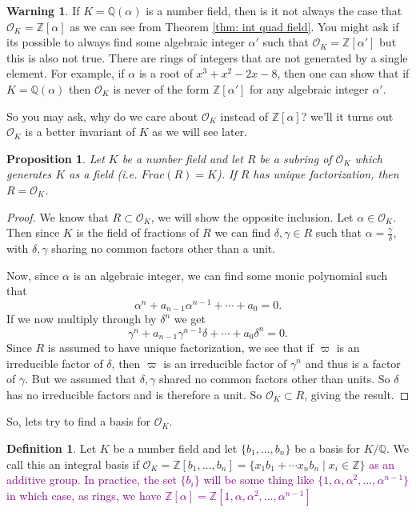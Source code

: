 \documentclass[11pt,a4paper]{report}
\theoremstyle{plain}
\newtheorem{prop}[subsection]{Proposition}
\theoremstyle{definition}
\newtheorem{defn}[subsection]{Definition}
\theoremstyle{definition}
\newtheorem{warn}[subsection]{Warning}
\newcommand{\ZZ}{\mathbb{Z}}
\def\QQ{\mathbb{Q}}
\def \a{\alpha}
\def \g {\gamma}
\def \OO {\mathcal{O}}
\begin{document}
	\begin{warn}
		If $K=\QQ(\a)$ is a number field, then is it not always the case that $\OO_K=\ZZ[\a]$ as we can see from Theorem \ref{thm: int quad field}. You might ask if its possible to always find some algebraic integer $\a'$ such that $\OO_K=\ZZ[\a']$ but this is also not true. There are rings of integers that are not generated by a single element. For example, if $\a$ is a root of $x^3+x^2-2x-8$, then one can show that if $K=\QQ(\a)$ then $\OO_K$ is never of the form $\ZZ[\a']$ for any algebraic integer $\a'$.
	\end{warn}
	
	
	So you may ask, why do we care about $\OO_K$ instead of $\ZZ[\a]$? we'll it turns out $\OO_K$ is a better invariant of $K$ as we will see later. 
	
	\begin{prop}
		Let $K$ be a number field and let $R$ be a subring of $\OO_K$ which generates $K$ as a field (i.e. $Frac(R)=K$).  If $R$ has unique factorization, then $R=\OO_K$.
	\end{prop}
	
	\begin{proof}
		We know that $R \subset \OO_K$, we will show the opposite inclusion. Let $\a \in \OO_K$. Then since $K$ is the field of fractions of $R$ we can find $\delta,\gamma \in R$ such that $\a=\frac{\gamma}{\delta}$, with $\delta,\gamma$ sharing no common factors other than a unit. 
		
		Now, since $\a$ is an algebraic integer, we can find some monic polynomial such that \[\a^n+a_{n-1}\a^{n-1}+\cdots+a_0=0.\] If we now multiply through by $\delta^n$ we get  \[\gamma^n+a_{n-1}\g^{n-1}\delta+\cdots+a_0\delta^n=0.\] Since $R$ is assumed to have unique factorization, we see that if $\varpi$ is an irreducible factor of $\delta$, then $\varpi$ is an irreducible factor of $\gamma^n$ and thus is a factor of $\gamma$. But we assumed that $\delta,\gamma$ shared no common factors other than units. So $\delta$ has no irreducible factors and is therefore a unit. So $\OO_K \subset R$, giving the result.
	\end{proof}
	
	So, lets try to find a basis for $\OO_K$. 
	
	\begin{defn}\label{defn: int basis}
		Let $K$ be a number field and let $\{b_1,\dots,b_n\}$ be a basis for $K/\QQ$. We call this an integral basis if $\OO_K=\ZZ[b_1,\dots,b_n]=\{x_1b_1+\cdots x_nb_n \mid x_i \in \ZZ\}$ \textcolor{purple}{as an additive group.  In practice, the set $\{b_i\}$ will be some thing like $\{1,\a,\a^2,\dots,\a^{n-1}\}$ in which case, as rings, we have $\ZZ[\a]=\ZZ[1,\a,\a^2,\dots,\a^{n-1}]$}
	\end{defn}
	
\end{document}
